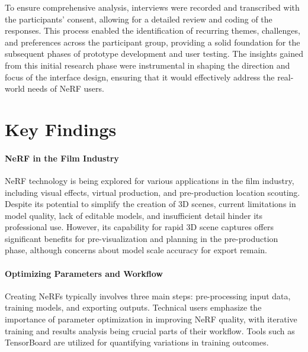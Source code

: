 To ensure comprehensive analysis, interviews were recorded and transcribed with the participants' consent, allowing for a detailed review and coding of the responses. 
This process enabled the identification of recurring themes, challenges, and preferences across the participant group, providing a solid foundation for the subsequent phases of prototype development and user testing. 
The insights gained from this initial research phase were instrumental in shaping the direction and focus of the interface design, ensuring that it would effectively address the real-world needs of NeRF users.

\section{Key Findings}
\label{sec:user-research:findings}


\paragraph{NeRF in the Film Industry}
NeRF technology is being explored for various applications in the film industry, including visual effects, virtual production, and pre-production location scouting. 
Despite its potential to simplify the creation of 3D scenes, current limitations in model quality, lack of editable models, and insufficient detail hinder its professional use. 
However, its capability for rapid 3D scene captures offers significant benefits for pre-visualization and planning in the pre-production phase, although concerns about model scale accuracy for export remain. 
\cite{P2, P4}



\paragraph{Optimizing Parameters and Workflow}
Creating NeRFs typically involves three main steps: pre-processing input data, training models, and exporting outputs. 
Technical users emphasize the importance of parameter optimization in improving NeRF quality, with iterative training and results analysis being crucial parts of their workflow.
Tools such as TensorBoard \cite{noauthor_tensorflowtensorboard_2024} are utilized for quantifying variations in training outcomes. 
\cite{P1, P3}

